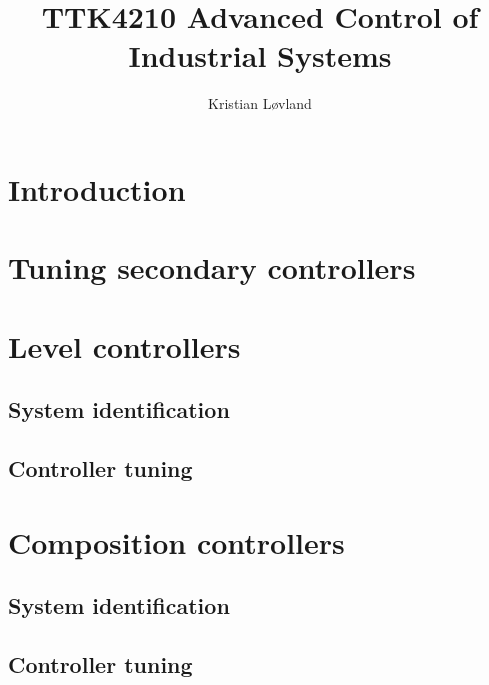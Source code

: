\documentclass[12pt]{article}
\title{TTK4210 Advanced Control of Industrial Systems}
\date{}
\author{Kristian Løvland}
\begin{document}
\maketitle

\section{Introduction}

\section{Tuning secondary controllers}

\newpage
\section{Level controllers}
\subsection{System identification}
\subsection{Controller tuning}

\newpage
\section{Composition controllers}
\subsection{System identification}
\subsection{Controller tuning}
\end{document}
